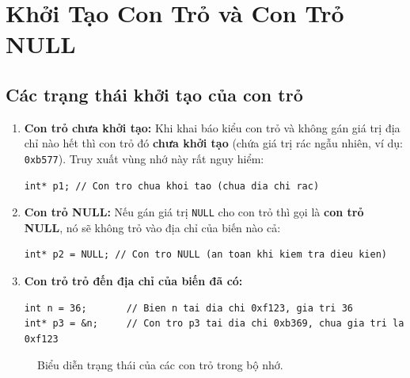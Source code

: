 \documentclass[12pt,a4paper]{article}
\begin{document}
\section{Khởi Tạo Con Trỏ và Con Trỏ NULL}

\subsection{Các trạng thái khởi tạo của con trỏ}
\begin{enumerate}[itemsep=0.25em]
    \item \textbf{Con trỏ chưa khởi tạo:} Khi khai báo kiểu con trỏ và không gán giá trị địa chỉ nào hết thì con trỏ đó \textbf{chưa khởi tạo} (chứa giá trị rác ngẫu nhiên, ví dụ: \texttt{0xb577}). Truy xuất vùng nhớ này rất nguy hiểm:
    \begin{lstlisting}
int* p1; // Con tro chua khoi tao (chua dia chi rac)
    \end{lstlisting}
    
    \item \textbf{Con trỏ NULL:} Nếu gán giá trị \texttt{NULL} cho con trỏ thì gọi là \textbf{con trỏ NULL}, nó sẽ không trỏ vào địa chỉ của biến nào cả:
    \begin{lstlisting}
int* p2 = NULL; // Con tro NULL (an toan khi kiem tra dieu kien)
    \end{lstlisting}

    \item \textbf{Con trỏ trỏ đến địa chỉ của biến đã có:}
    \begin{lstlisting}
int n = 36;       // Bien n tai dia chi 0xf123, gia tri 36
int* p3 = &n;     // Con tro p3 tai dia chi 0xb369, chua gia tri la 0xf123
    \end{lstlisting}
\end{enumerate}

\begin{figure}[H]
\centering
{}
\caption{Biểu diễn trạng thái của các con trỏ trong bộ nhớ.}
\end{figure}
\end{document}
